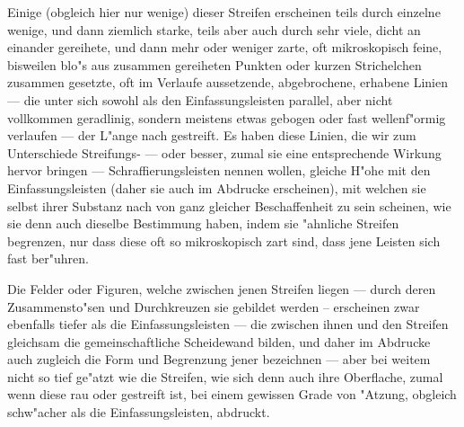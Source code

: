 \documentclass[a4paper, 11pt, oneside, german]{article}
\begin{document}
Einige (obgleich hier nur wenige) dieser Streifen erscheinen teils durch einzelne wenige, und dann ziemlich starke, teils aber auch durch sehr viele, dicht an einander gereihete, und dann mehr oder weniger zarte, oft mikroskopisch feine, bisweilen blo"s aus zusammen gereiheten Punkten oder kurzen Strichelchen zusammen gesetzte, oft im Verlaufe aussetzende, abgebrochene, erhabene Linien --- die unter sich sowohl als den Einfassungsleisten parallel, aber nicht vollkommen geradlinig, sondern meistens etwas gebogen oder fast wellenf"ormig verlaufen --- der L"ange nach gestreift. Es haben diese Linien, die wir zum Unterschiede Streifungs- --- oder besser, zumal sie eine entsprechende Wirkung hervor bringen --- Schraffierungsleisten nennen wollen, gleiche H"ohe mit den Einfassungsleisten (daher sie auch im Abdrucke erscheinen), mit welchen sie selbst ihrer Substanz nach von ganz gleicher Beschaffenheit zu sein scheinen, wie sie denn auch dieselbe Bestimmung haben, indem sie "ahnliche Streifen begrenzen, nur dass diese oft so mikroskopisch zart sind, dass jene Leisten sich fast ber"uhren.

Die Felder oder Figuren, welche zwischen jenen Streifen liegen --- durch deren Zusammensto"sen und Durchkreuzen sie gebildet werden -- erscheinen zwar ebenfalls tiefer als die Einfassungsleisten --- die zwischen ihnen und den Streifen gleichsam die gemeinschaftliche Scheidewand bilden, und daher im Abdrucke auch zugleich die Form und Begrenzung jener bezeichnen --- aber bei weitem nicht so tief ge"atzt wie die Streifen, wie sich denn auch ihre Oberflache, zumal wenn diese rau oder gestreift ist, bei einem gewissen Grade von "Atzung, obgleich schw"acher als die Einfassungsleisten, abdruckt.
\end{document}
